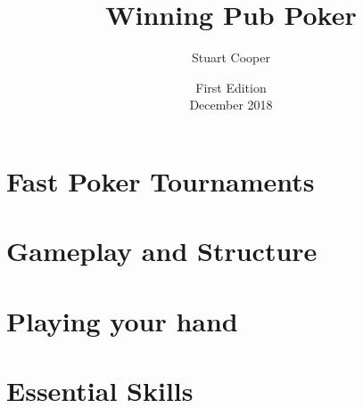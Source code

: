 \documentclass{book}
\begin{document}



\title{Winning Pub Poker}
\author{Stuart Cooper}
\date{First Edition\\December 2018}


\maketitle
\tableofcontents


\part{Fast Poker Tournaments}





\part{Gameplay and Structure}



\part{Playing your hand}




\part{Essential Skills}




% 






\end{document}
